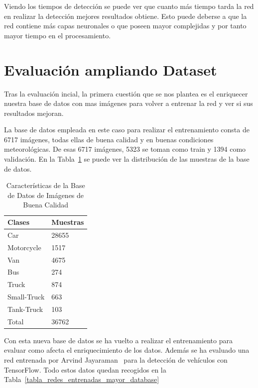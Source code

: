 Viendo los tiempos de detección se puede ver que cuanto más tiempo tarda la red en realizar la detección mejores resultados obtiene. Esto puede deberse a que la red contiene más capas neuronales o que poseen mayor complejidas y por tanto mayor tiempo en el procesamiento.


\section{Evaluación ampliando Dataset}\label{sec.ampliado_dataset}

Tras la evaluación incial, la primera cuestión que se nos plantea es el enriquecer nuestra base de datos con mas imágenes para volver a entrenar la red y ver si sus resultados mejoran. 

La base de datos empleada en este caso para realizar el entrenamiento consta de 6717 imágenes, todas ellas de buena calidad y en buenas condiciones meteorológicas. De esas 6717 imágenes, 5323 se toman como train y 1394 como validación. En la Tabla~\ref{tabla_redes_database_mayor} se puede ver la distribución de las muestras de la base de datos.

\begin{table}[htbp][H] 
\begin{center}
\begin{tabular}{|l|l|}
\hline
Clases & Muestras \\
\hline \hline
Car & 28655 \\ \hline
Motorcycle & 1517 \\ \hline
Van & 4675 \\ \hline
Bus & 274 \\ \hline
Truck & 874 \\ \hline
Small-Truck & 663 \\ \hline
Tank-Truck & 103 \\ \hline
Total & 36762 \\ \hline
\end{tabular}
\caption{Características de la Base de Datos de Imágenes de Buena Calidad}
\label{tabla_redes_database_mayor}
\end{center}
\end{table}

Con esta nueva base de datos se ha vuelto a realizar el entrenamiento para evaluar como afecta el enriquecimiento de los datos. Además se ha evaluado una red entrenada por Arvind Jayaraman~\cite{CarND_VehicleDetection} para la detección de vehículos con TensorFlow. Todo estos datos quedan recogidos en la Tabla~\ref{tabla_redes_entrenadas_mayor_database}

